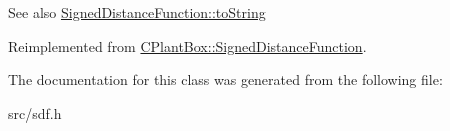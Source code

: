 \begin{DoxySeeAlso}{See also}
\hyperlink{classCPlantBox_1_1SignedDistanceFunction_a9f375961d9a24b06dc669ac67aa16fa6}{Signed\+Distance\+Function\+::to\+String} 
\end{DoxySeeAlso}


Reimplemented from \hyperlink{classCPlantBox_1_1SignedDistanceFunction_a9f375961d9a24b06dc669ac67aa16fa6}{C\+Plant\+Box\+::\+Signed\+Distance\+Function}.



The documentation for this class was generated from the following file\+:\begin{DoxyCompactItemize}
\item 
src/sdf.\+h\end{DoxyCompactItemize}
